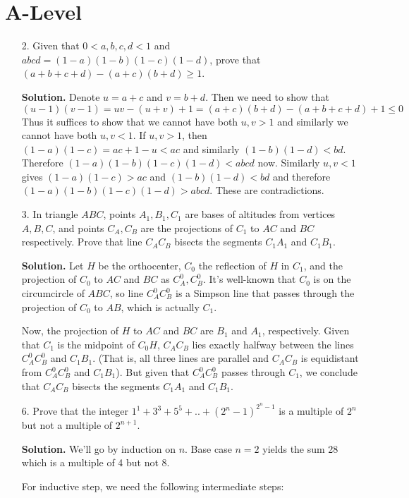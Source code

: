 \documentclass[11pt,a4paper]{article}
\begin{document}
\section*{A-Level}
\begin{enumerate}
	\item[2.] Given that $0 < a, b, c, d < 1$ and $abcd = (1 - a)(1 - b)(1 - c)(1 - d)$, prove that $(a + b + c + d) -(a + c)(b + d) \ge 1$. 
	
	\textbf{Solution.} Denote $u=a+c$ and $v=b+d$. Then we need to show that 
	\[
	(u-1)(v-1)=uv-(u+v)+1=(a+c)(b+d)-(a+b+c+d)+1\le 0
	\]
	Thus it suffices to show that we cannot have both $u, v>1$ and similarly we cannot have both $u, v<1$. If $u, v>1$, then $(1-a)(1-c)=ac+1-u<ac$ and similarly $(1-b)(1-d)<bd$. Therefore $(1-a)(1-b)(1-c)(1-d)<abcd$ now. Similarly $u, v<1$ gives $(1-a)(1-c)>ac$ and $(1-b)(1-d)<bd$ and therefore $(1-a)(1-b)(1-c)(1-d)>abcd$. These are contradictions. 
	
	\item[3.]  In triangle $ABC$, points $A_1,B_1,C_1$ are bases of altitudes from vertices $A,B,C$, and points $C_A,C_B$ are the projections of $C_1$ to $AC$ and $BC$ respectively. Prove that line $C_AC_B$ bisects the segments $C_1A_1$ and $C_1B_1$.
	
	\textbf{Solution.} Let $H$ be the orthocenter, $C_0$ the reflection of $H$ in $C_1$, and the projection of $C_0$ to $AC$ and $BC$ as $C^{0}_A, C^{0}_B$. It's well-known that $C_0$ is on the circumcircle of $ABC$, so line $C^{0}_AC^{0}_B$ is a Simpson line that passes through the projection of $C_0$ to $AB$, which is actually $C_1$. 
	
	Now, the projection of $H$ to $AC$ and $BC$ are $B_1$ and $A_1$, respectively. Given that $C_1$ is the midpoint of $C_0H$, $C_AC_B$ lies exactly halfway between the lines $C^{0}_AC^{0}_B$ and $C_1B_1$. (That is, all three lines are parallel and $C_AC_B$ is equidistant from $C^{0}_AC^{0}_B$ and $C_1B_1$). But given that $C^{0}_AC^{0}_B$ passes through $C_1$, we conclude that $C_AC_B$ bisects the segments $C_1A_1$ and $C_1B_1$.
	
	\item[6.] Prove that the integer $1^1 + 3^3 + 5^5 + .. + (2^n - 1)^{2^n-1}$ is a multiple of $2^n$ but not a multiple of $2^{n+1}$.
	
	\textbf{Solution.} We'll go by induction on $n$. Base case $n=2$ yields the sum 28 which is a multiple of 4 but not 8. 
	
	For inductive step, we need the following intermediate steps: 
	

\end{enumerate}
\end{document}
